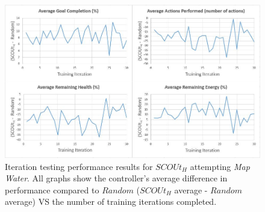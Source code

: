 \begin{figure}[H]
  \includegraphics[width=1.0\columnwidth]{Figures/Results/Training/SCOUt-Hybrid-MapWater.JPG}
  \caption{Iteration testing performance results for $SCOUt_{H}$ attempting \textit{Map Water}. All graphs show the controller's average difference in performance compared to $Random$ ($SCOUt_{H}$ average - $Random$ average) VS the number of training iterations completed.}
  \label{fig:hybrid_training_results_mw}
\end{figure}


